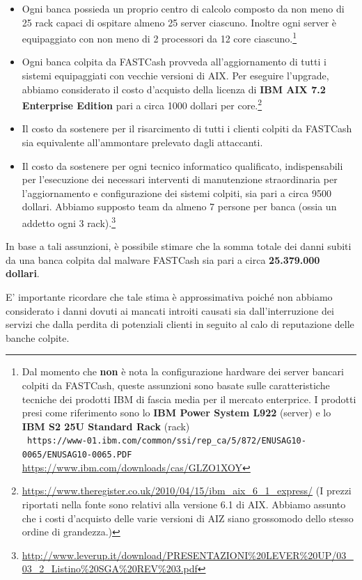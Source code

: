 \documentclass[10pt,a4paper, titlepage]{report}
\begin{document}
\begin{itemize}
\item Ogni banca possieda un proprio centro di calcolo composto da non meno di 25 rack capaci di ospitare almeno 25 server ciascuno. Inoltre ogni server è equipaggiato con non meno di 2 processori da 12 core ciascuno.\footnote{Dal momento che \textbf{non} è nota la configurazione hardware dei server bancari colpiti da FASTCash, queste assunzioni sono basate sulle caratteristiche tecniche dei prodotti IBM di fascia media per il mercato enterprice. I prodotti presi come riferimento sono lo \textbf{IBM Power System L922} (server) e lo \textbf{IBM S2 25U Standard Rack} (rack) \\ \texttt{ https://www-01.ibm.com/common/ssi/rep\_ca/5/872/ENUSAG10-0065/ENUSAG10-0065.PDF} \\ \url{https://www.ibm.com/downloads/cas/GLZO1XOY}}
\item Ogni banca colpita da FASTCash provveda all'aggiornamento di tutti i sistemi equipaggiati con vecchie versioni di AIX. Per eseguire l'upgrade, abbiamo considerato il costo d'acquisto della licenza di \textbf{IBM AIX 7.2 Enterprise Edition} pari a circa 1000 dollari per core.\footnote{\url{https://www.theregister.co.uk/2010/04/15/ibm\_aix\_6\_1\_express/} (I prezzi riportati nella fonte sono relativi alla versione 6.1 di AIX. Abbiamo assunto che i costi d'acquisto delle varie versioni di AIZ siano grossomodo dello stesso ordine di grandezza.)}
\item Il costo da sostenere per il risarcimento di tutti i clienti colpiti da FASTCash sia equivalente all'ammontare prelevato dagli attaccanti.
\item Il costo da sostenere per ogni tecnico informatico qualificato, indispensabili per l'esecuzione dei necessari interventi di manutenzione straordinaria per l'aggiornamento e configurazione dei sistemi colpiti, sia pari a circa 9500 dollari. Abbiamo supposto team da almeno 7 persone per banca (ossia un addetto ogni 3 rack).\footnote{\url{http://www.leverup.it/download/PRESENTAZIONI\%20LEVER\%20UP/03\_03\_2\_Listino\%20SGA\%20REV\%203.pdf}}
\end{itemize}

In base a tali assunzioni, è possibile stimare che la somma totale dei danni subiti da una banca colpita dal malware FASTCash sia pari a circa \textbf{25.379.000 dollari}.

E' importante ricordare che tale stima è approssimativa poiché non abbiamo considerato i danni dovuti ai mancati introiti causati sia dall'interruzione dei servizi che dalla perdita di potenziali clienti in seguito al calo di reputazione delle banche colpite.
\end{document}

